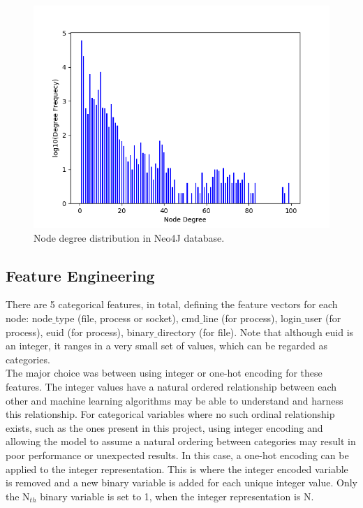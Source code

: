 \begin{figure}[H]
  \centering
  \centerline{\includegraphics[scale = 0.7]{Images/nodedegdist.png}}
  \caption{Node degree distribution in Neo4J database.}
  \label{nodedegdist}
\end{figure}


\subsection{Feature Engineering}

There are 5 categorical features, in total, defining the feature vectors for each node: node$\_$type (file, process or socket), cmd$\_$line (for process), login$\_$user (for process), euid (for process), binary$\_$directory (for file). Note that although euid is an integer, it ranges in a very small set of values, which can be regarded as categories. \\


The major choice was between using integer or one-hot encoding for these features. The integer values have a natural ordered relationship between each other and machine learning algorithms may be able to understand and harness this relationship. For categorical variables where no such ordinal relationship exists, such as the ones present in this project, using integer encoding and allowing the model to assume a natural ordering between categories may result in poor performance or unexpected results. In this case, a one-hot encoding can be applied to the integer representation. This is where the integer encoded variable is removed and a new binary variable is added for each unique integer value. Only the N$_{th}$ binary variable is set to 1, when the integer representation is N. \\

